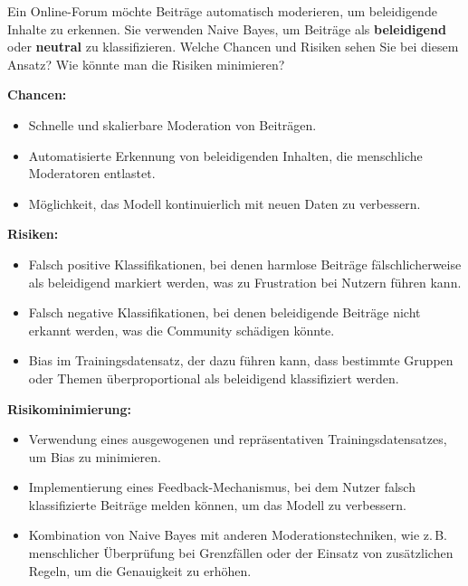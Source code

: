 \begin{mychallenge}
    Ein Online-Forum möchte Beiträge automatisch moderieren, um beleidigende Inhalte zu erkennen. Sie verwenden Naive Bayes, um Beiträge als \textbf{beleidigend} oder \textbf{neutral} zu klassifizieren. Welche Chancen und Risiken sehen Sie bei diesem Ansatz? Wie könnte man die Risiken minimieren?
    \begin{myanswer}
        \textbf{Chancen:}
        \begin{itemize}
            \item Schnelle und skalierbare Moderation von Beiträgen.
            \item Automatisierte Erkennung von beleidigenden Inhalten, die menschliche Moderatoren entlastet.
            \item Möglichkeit, das Modell kontinuierlich mit neuen Daten zu verbessern.
        \end{itemize}
        \textbf{Risiken:}
        \begin{itemize}
            \item Falsch positive Klassifikationen, bei denen harmlose Beiträge fälschlicherweise als beleidigend markiert werden, was zu Frustration bei Nutzern führen kann.
            \item Falsch negative Klassifikationen, bei denen beleidigende Beiträge nicht erkannt werden, was die Community schädigen könnte.
            \item Bias im Trainingsdatensatz, der dazu führen kann, dass bestimmte Gruppen oder Themen überproportional als beleidigend klassifiziert werden.
        \end{itemize}
        \textbf{Risikominimierung:}
        \begin{itemize}
            \item Verwendung eines ausgewogenen und repräsentativen Trainingsdatensatzes, um Bias zu minimieren.
            \item Implementierung eines Feedback-Mechanismus, bei dem Nutzer falsch klassifizierte Beiträge melden können, um das Modell zu verbessern.
            \item Kombination von Naive Bayes mit anderen Moderationstechniken, wie z.\,B. menschlicher Überprüfung bei Grenzfällen oder der Einsatz von zusätzlichen Regeln, um die Genauigkeit zu erhöhen.
        \end{itemize}
    \end{myanswer}
\end{mychallenge}
